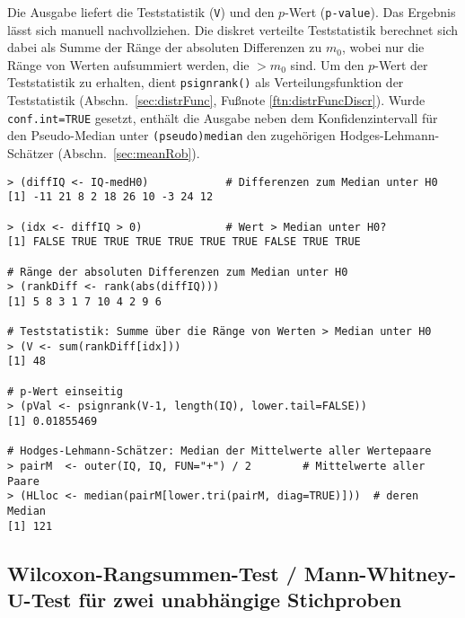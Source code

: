 Die Ausgabe liefert die Teststatistik (\lstinline!V!) und den $p$-Wert (\lstinline!p-value!). Das Ergebnis lässt sich manuell nachvollziehen. Die diskret verteilte Teststatistik berechnet sich dabei als Summe der Ränge der absoluten Differenzen zu $m_{0}$, wobei nur die Ränge von Werten aufsummiert werden, die $> m_{0}$ sind. Um den $p$-Wert der Teststatistik zu erhalten, dient \lstinline!psignrank()! als Verteilungsfunktion der Teststatistik (Abschn.\ \ref{sec:distrFunc}, Fußnote \ref{ftn:distrFuncDiscr}). Wurde \lstinline!conf.int=TRUE! gesetzt, enthält die Ausgabe neben dem Konfidenzintervall für den Pseudo-Median  unter \lstinline!(pseudo)median! den zugehörigen Hodges-Lehmann-Schätzer (Abschn.\ \ref{sec:meanRob}).
\begin{lstlisting}
> (diffIQ <- IQ-medH0)            # Differenzen zum Median unter H0
[1] -11 21 8 2 18 26 10 -3 24 12

> (idx <- diffIQ > 0)             # Wert > Median unter H0?
[1] FALSE TRUE TRUE TRUE TRUE TRUE TRUE FALSE TRUE TRUE

# Ränge der absoluten Differenzen zum Median unter H0
> (rankDiff <- rank(abs(diffIQ)))
[1] 5 8 3 1 7 10 4 2 9 6

# Teststatistik: Summe über die Ränge von Werten > Median unter H0
> (V <- sum(rankDiff[idx]))
[1] 48

# p-Wert einseitig
> (pVal <- psignrank(V-1, length(IQ), lower.tail=FALSE))
[1] 0.01855469

# Hodges-Lehmann-Schätzer: Median der Mittelwerte aller Wertepaare
> pairM  <- outer(IQ, IQ, FUN="+") / 2        # Mittelwerte aller Paare
> (HLloc <- median(pairM[lower.tri(pairM, diag=TRUE)]))  # deren Median
[1] 121
\end{lstlisting}

\subsection[Wilcoxon-Rangsummen-Test / Mann-Whitney-\texorpdfstring{$U$}{U}-Test]{Wilcoxon-Rangsummen-Test / Mann-Whitney-$\bm{U}$-Test für zwei unabhängige Stichproben}
\label{sec:wilcoxRankSum}


